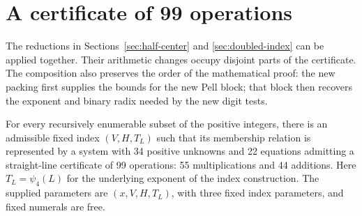 \section{A certificate of 99 operations}\label{sec:composed-99}

The reductions in Sections~\ref{sec:half-center} and
\ref{sec:doubled-index} can be applied together. Their arithmetic
changes occupy disjoint parts of the certificate. The composition
also preserves the order of the mathematical proof: the new packing
first supplies the bounds for the new Pell block; that block then
recovers the exponent and binary radix needed by the new digit tests.

\begin{theorem}\label{thm:best99}
For every recursively enumerable subset of the positive integers,
there is an admissible fixed index $(V,H,T_L)$ such that its membership
relation is represented by a system with 34 positive unknowns and
22 equations admitting a straight-line certificate of 99 operations:
55 multiplications and 44 additions. Here $T_L=\psi_4(L)$ for the
underlying exponent of the index construction. The supplied parameters
are $(x,V,H,T_L)$, with three fixed index parameters, and fixed numerals
are free.
\end{theorem}

